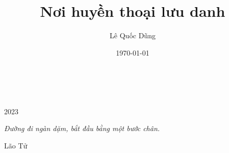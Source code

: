 \documentclass{article}
\title{Nơi huyền thoại lưu danh}
\author{Lê Quốc Dũng}
\date{\today}
\theoremstyle{definition}
\begin{document}
\newenvironment{myexampleblock}[1]{%
    \tcolorbox[colback=LightGreen,colframe=DarkGreen,title=#1]}
    {\endtcolorbox}

\newenvironment{defblock}[2]{%
    \tcolorbox[colback=white,colframe=blue
    ,title=#1
    ]}
    {\endtcolorbox}

\newenvironment{theoremblock}[2]{%
    \tcolorbox[colback=white,colframe=magenta
    ,title=#1
    ]}
    {\endtcolorbox}

\begin{titlepage}
		\\
			
		\vspace{10mm}
		\\
		\vspace{\fill}
		\centering \large{2023}
\end{titlepage}

\newpage

\vspace*{2cm}

\begin{center}
	\Large{\parbox{10cm}{
		\begin{raggedright}
		{\Large 
			\textit{Đường đi ngàn dặm, bắt đầu bằng một bước chân.}
		}
	
		\vspace{.5cm}\hfill{Lão Tử}
		\end{raggedright}
	}
}
\end{center}

\newpage

\tableofcontents

\newpage










\end{document}
